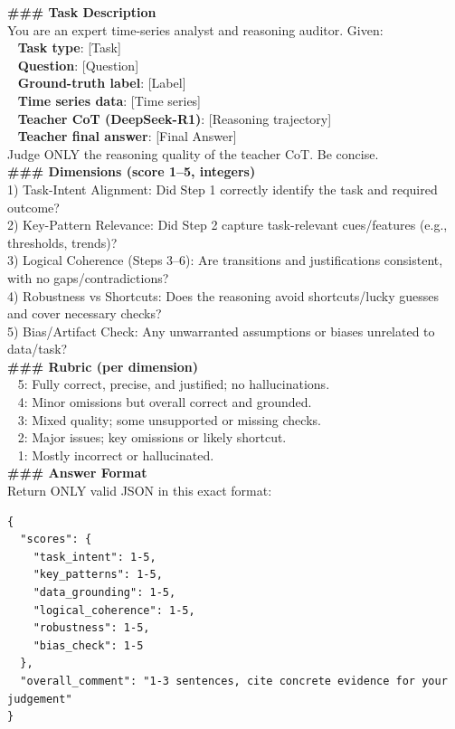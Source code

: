 \documentclass{article}
\theoremstyle{plain}
\theoremstyle{definition}
\theoremstyle{remark}
\begin{document}
\begin{prompt}
\textbf{\#\#\# Task Description} \\
You are an expert time-series analyst and reasoning auditor. Given: \\
\textendash~ \textbf{Task type}: \textcolor{BrownRed}{[Task]} \\
\textendash~ \textbf{Question}: \textcolor{BrownRed}{[Question]} \\
\textendash~ \textbf{Ground-truth label}: \textcolor{BrownRed}{[Label]} \\
\textendash~ \textbf{Time series data}: \textcolor{BrownRed}{[Time series]} \\
\textendash~ \textbf{Teacher CoT (DeepSeek-R1)}: \textcolor{BrownRed}{[Reasoning trajectory]} \\
\textendash~ \textbf{Teacher final answer}: \textcolor{BrownRed}{[Final Answer]} \\

Judge ONLY the reasoning quality of the teacher CoT. Be concise. \\

\textbf{\#\#\# Dimensions (score 1–5, integers)} \\
1) Task-Intent Alignment: Did Step 1 correctly identify the task and required outcome? \\
2) Key-Pattern Relevance: Did Step 2 capture task-relevant cues/features (e.g., thresholds, trends)? \\
3) Logical Coherence (Steps 3–6): Are transitions and justifications consistent, with no gaps/contradictions? \\
4) Robustness vs Shortcuts: Does the reasoning avoid shortcuts/lucky guesses and cover necessary checks? \\
5) Bias/Artifact Check: Any unwarranted assumptions or biases unrelated to data/task? \\

\textbf{\#\#\# Rubric (per dimension)} \\
\textendash~ 5: Fully correct, precise, and justified; no hallucinations. \\
\textendash~ 4: Minor omissions but overall correct and grounded. \\
\textendash~ 3: Mixed quality; some unsupported or missing checks. \\
\textendash~ 2: Major issues; key omissions or likely shortcut. \\
\textendash~ 1: Mostly incorrect or hallucinated. \\

\textbf{\#\#\# Answer Format} \\
Return ONLY valid JSON in this exact format:
\begin{verbatim}
{
  "scores": {
    "task_intent": 1-5,
    "key_patterns": 1-5,
    "data_grounding": 1-5,
    "logical_coherence": 1-5,
    "robustness": 1-5,
    "bias_check": 1-5
  },
  "overall_comment": "1-3 sentences, cite concrete evidence for your judgement"
}
\end{verbatim}
\end{prompt}



\end{document}
